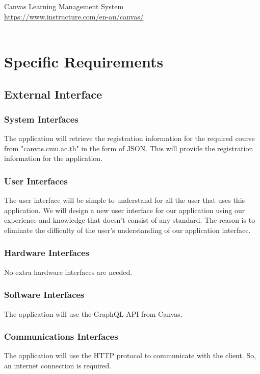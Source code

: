 \documentclass[ 10pt]{report}
\begin{document}
    \noindent Canvas Learning Management System \\
    \href{https://www.instructure.com/en-au/canvas/}{https://www.instructure.com/en-au/canvas/} \\\\
    \pagebreak

    \section{Specific Requirements}
        \subsection{External Interface}
            \subsubsection{System Interfaces}
            The application will retrieve the registration information for the required course from "canvas.cmu.ac.th" in the form of JSON. This will provide the registration information for the application.
            \subsubsection{User Interfaces}
            The user interface will be simple to understand for all the user that uses this application. We will design a new user interface for our application using our experience and knowledge that doesn't consist of any standard. The reason is to eliminate the difficulty of the user's understanding of our application interface. 
            \subsubsection{Hardware Interfaces}
            No extra hardware interfaces are needed.
            \subsubsection{Software Interfaces}
            The application will use the GraphQL API from Canvas.
            \subsubsection{Communications Interfaces}
            The application will use the HTTP protocol to communicate with the client. So, an internet connection is required.
\end{document}

